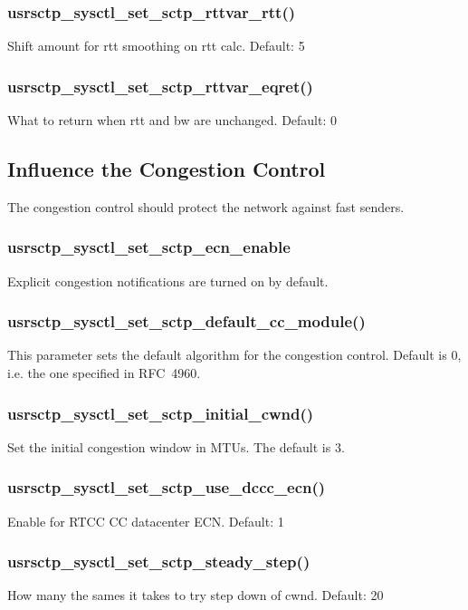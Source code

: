\documentclass[a4paper]{article}
\begin{document}
\subsubsection{usrsctp\_sysctl\_set\_sctp\_rttvar\_rtt()}
Shift amount for rtt smoothing on rtt calc. Default: 5

\subsubsection{usrsctp\_sysctl\_set\_sctp\_rttvar\_eqret()}
What to return when rtt and bw are unchanged. Default: 0


\subsection{Influence the Congestion Control}
The congestion control should protect the network against fast senders. 

\subsubsection{usrsctp\_sysctl\_set\_sctp\_ecn\_enable}
Explicit congestion notifications are turned on by default.

\subsubsection{usrsctp\_sysctl\_set\_sctp\_default\_cc\_module()}
This parameter sets the default algorithm for the congestion control.
Default is 0, i.e. the one specified in RFC~4960.

\subsubsection{usrsctp\_sysctl\_set\_sctp\_initial\_cwnd()}
Set the initial congestion window in MTUs. The default is 3.

\subsubsection{usrsctp\_sysctl\_set\_sctp\_use\_dccc\_ecn()}
Enable for RTCC CC datacenter ECN. Default: 1

\subsubsection{usrsctp\_sysctl\_set\_sctp\_steady\_step()}
How many the sames it takes to try step down of cwnd. Default: 20
\end{document}

